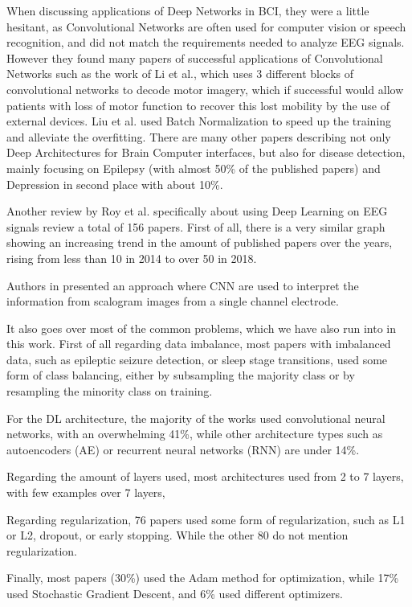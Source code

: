 \documentclass[conference]{IEEEtran}
\begin{document}
When discussing applications of Deep Networks in BCI, they were a little hesitant, as Convolutional Networks are often used for computer vision or speech recognition, and did not match the requirements needed to analyze EEG signals. However they found many papers of successful applications of Convolutional Networks such as the work of Li et al.\cite{LI8709723}, which uses 3 different blocks of convolutional networks to decode motor imagery, which if successful would allow patients with loss of motor function to recover this lost mobility by the use of external devices. Liu et al. \cite{LIU2018288} used Batch Normalization to speed up the training and alleviate the overfitting. There are many other papers describing not only Deep Architectures for Brain Computer interfaces, but also for disease detection, mainly focusing on Epilepsy (with almost  50\% of the published papers) and Depression in second place with about 10\%.

Another review by Roy et al.\cite{RoyReview} specifically about using Deep Learning on EEG signals review a total of 156 papers. First of all, there is a very similar graph showing an increasing trend in the amount of published papers over the years, rising from less than 10 in 2014 to over 50 in 2018.

Authors in \cite{Singh.2021} presented an approach where CNN are used to interpret the information from scalogram images from a single channel electrode.


It also goes over most of the common problems, which we have also run into in this work. First of all regarding data imbalance, most papers with imbalanced data, such as epileptic seizure detection, or sleep stage transitions, used some form of class balancing, either by subsampling the majority class or by resampling the minority class on training.

For the DL architecture, the majority of the works used convolutional neural networks, with an overwhelming 41\%, while other architecture types such as autoencoders (AE) or recurrent neural networks (RNN) are under 14\%.

Regarding the amount of layers used, most architectures used from 2 to 7 layers, with  few examples over 7 layers,

Regarding regularization, 76 papers used some form of regularization, such as L1 or L2, dropout, or early stopping. While the other 80 do not mention regularization.

Finally, most papers (30\%) used the Adam method for optimization, while 17\% used Stochastic Gradient Descent, and 6\% used different optimizers.
\end{document}
